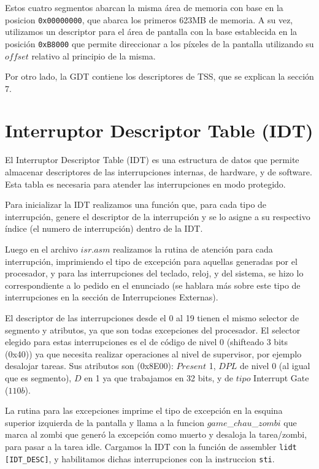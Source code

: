 \documentclass[a4paper]{article}
\begin{document}
Estos cuatro segmentos abarcan la misma área de memoria con base en la posicion \texttt{0x00000000}, que abarca los primeros 623MB de memoria. A su vez, utilizamos un descriptor para el área de pantalla con la base establecida en la posición \texttt{0xB8000} que permite direccionar a los píxeles de la pantalla utilizando su $offset$ relativo al principio de la misma.

Por otro lado, la GDT contiene los descriptores de TSS, que se explican la sección 7.

\section{Interruptor Descriptor Table (IDT)}
El Interruptor Descriptor Table (IDT) es una estructura de datos que permite almacenar descriptores de las interrupciones internas, de hardware, y de software. Esta tabla es necesaria para atender las interrupciones en modo protegido.

Para inicializar la IDT realizamos una función que, para cada tipo de interrupción, genere el descriptor de la interrupción y se lo asigne a su respectivo índice (el numero de interrupción) dentro de la IDT. 

Luego en el archivo $isr.asm$ realizamos la rutina de atención para cada interrupción, imprimiendo el tipo de excepción para aquellas generadas por el procesador, y para las interrupciones del teclado, reloj, y del sistema, se hizo lo correspondiente a lo pedido en el enunciado (se hablara más sobre este tipo de interrupciones en la sección de Interrupciones Externas).%

El descriptor de las interrupciones desde el 0 al 19 tienen el mismo selector de segmento y atributos, ya que son todas excepciones del procesador. El selector elegido para estas interrupciones es el de código de nivel 0 (shifteado 3 bits (0x40)) ya que necesita realizar operaciones al nivel de supervisor, por ejemplo desalojar tareas. Sus atributos son (0x8E00): $Present$ 1, $DPL$ de nivel 0 (al igual que es segmento), $D$ en 1 ya que trabajamos en 32 bits, y de $tipo$ Interrupt Gate ($110b$).

La rutina para las excepciones imprime el tipo de excepción en la esquina superior izquierda de la pantalla y llama a la funcion $game$_$chau$_$zombi$ que marca al zombi que generó la excepción como muerto y desaloja la tarea/zombi, para pasar a la tarea idle. %
Cargamos la IDT con la función de assembler \texttt{lidt [IDT_DESC]}, y habilitamos dichas interrupciones con la instruccion \texttt{sti}.
\end{document}
